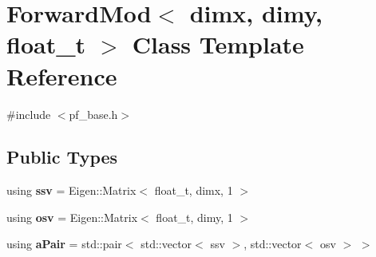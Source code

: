 \hypertarget{classForwardMod}{}\section{Forward\+Mod$<$ dimx, dimy, float\+\_\+t $>$ Class Template Reference}
\label{classForwardMod}


{\ttfamily \#include $<$pf\+\_\+base.\+h$>$}

\subsection*{Public Types}
\begin{DoxyCompactItemize}
\item 
\mbox{\label{classForwardMod_a32e8e8c3491d98db68e64cdca5bd05d9}} 
using {\bfseries ssv} = Eigen\+::\+Matrix$<$ float\+\_\+t, dimx, 1 $>$
\item 
\mbox{\label{classForwardMod_a81a5afb13a81b2ebb8196d626fa3f261}} 
using {\bfseries osv} = Eigen\+::\+Matrix$<$ float\+\_\+t, dimy, 1 $>$
\item 
\mbox{\label{classForwardMod_a9d17ccfbab8e42cf70cd61c2f2c1844f}} 
using {\bfseries a\+Pair} = std\+::pair$<$ std\+::vector$<$ ssv $>$, std\+::vector$<$ osv $>$ $>$
\end{DoxyCompactItemize}
